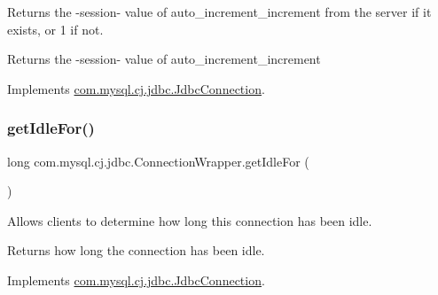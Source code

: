 Returns the -\/session-\/ value of \textquotesingle{}auto\+\_\+increment\+\_\+increment\textquotesingle{} from the server if it exists, or \textquotesingle{}1\textquotesingle{} if not.

\begin{DoxyReturn}{Returns}
the -\/session-\/ value of \textquotesingle{}auto\+\_\+increment\+\_\+increment\textquotesingle{} 
\end{DoxyReturn}


Implements \mbox{\hyperlink{interfacecom_1_1mysql_1_1cj_1_1jdbc_1_1_jdbc_connection_a06ded1274e682178c67fdb86f09fed5a}{com.\+mysql.\+cj.\+jdbc.\+Jdbc\+Connection}}.

\mbox{\label{classcom_1_1mysql_1_1cj_1_1jdbc_1_1_connection_wrapper_a4894df9d353212ae8b4e0860c15e6a6e}} 
\subsubsection{\texorpdfstring{get\+Idle\+For()}{getIdleFor()}}
{\footnotesize\ttfamily long com.\+mysql.\+cj.\+jdbc.\+Connection\+Wrapper.\+get\+Idle\+For (\begin{DoxyParamCaption}{ }\end{DoxyParamCaption})}

Allows clients to determine how long this connection has been idle.

\begin{DoxyReturn}{Returns}
how long the connection has been idle. 
\end{DoxyReturn}


Implements \mbox{\hyperlink{interfacecom_1_1mysql_1_1cj_1_1jdbc_1_1_jdbc_connection_a3a242d2fb1e6c443f163d55f8bbd6cde}{com.\+mysql.\+cj.\+jdbc.\+Jdbc\+Connection}}.

\mbox{\label{classcom_1_1mysql_1_1cj_1_1jdbc_1_1_connection_wrapper_a76eea5af4534baf71ff0852b0c0f6f9c}} 
